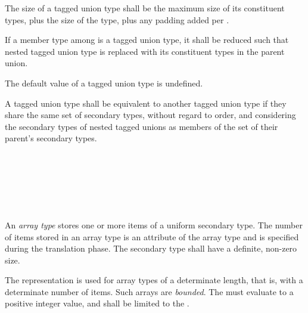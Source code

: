 \specsubsubitem
The size of a tagged union type shall be the maximum size of its constituent
types, plus the size of the  type, plus any padding added per
.

\specsubsubitem
If a member type among  is a tagged union type, it
shall be reduced such that nested tagged union type is replaced with its
constituent types in the parent union.


\specsubsubitem
The default value of a tagged union type is undefined.

\specsubsubitem
A tagged union type shall be equivalent to another tagged union type if they
share the same set of secondary types, without regard to order, and considering
the secondary types of nested tagged unions as members of the set of their
parent's secondary types.



\begin{grammar}
 \\
	\terminal{[} \terminal{]}  \\
	\terminal{[}  \terminal{]}  \\
	\terminal{[} \terminal{*} \terminal{]}  \\
	\terminal{[} \terminal{\_} \terminal{]}  \\
\end{grammar}

\specsubsubitem
An \textit{array type} stores one or more items of a uniform secondary type.
The number of items stored in an array type is an attribute of the array type
and is specified during the translation phase. The secondary type shall have a
definite, non-zero size.

\specsubsubitem
The  representation is used for array types of a
determinate length, that is, with a determinate number of items. Such arrays
are \textit{bounded}. The  must evaluate to a positive
integer value, and shall be limited to the .


